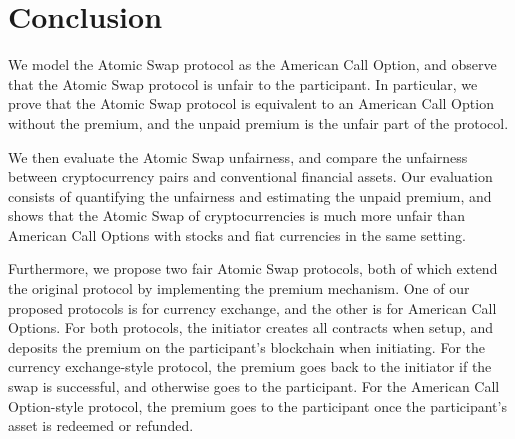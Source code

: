 \section{Conclusion}
\label{sec:conclusion}


We model the Atomic Swap protocol as the American Call Option,
and observe that the Atomic Swap protocol is unfair to the participant.
In particular, we prove that the Atomic Swap protocol is equivalent to an American Call Option without the premium,
and the unpaid premium is the unfair part of the protocol.

We then evaluate the Atomic Swap unfairness, and compare the unfairness between cryptocurrency pairs and conventional financial assets.
Our evaluation consists of quantifying the unfairness and estimating the unpaid premium,
and shows that the Atomic Swap of cryptocurrencies is much more unfair than American Call Options with stocks and fiat currencies in the same setting.

Furthermore, we propose two fair Atomic Swap protocols, both of which extend the original protocol by implementing the premium mechanism.
One of our proposed protocols is for currency exchange, and the other is for American Call Options.
For both protocols, the initiator creates all contracts when setup, and deposits the premium on the participant's blockchain when initiating.
For the currency exchange-style protocol, the premium goes back to the initiator if the swap is successful, and otherwise goes to the participant.
For the American Call Option-style protocol, the premium goes to the participant once the participant's asset is redeemed or refunded.